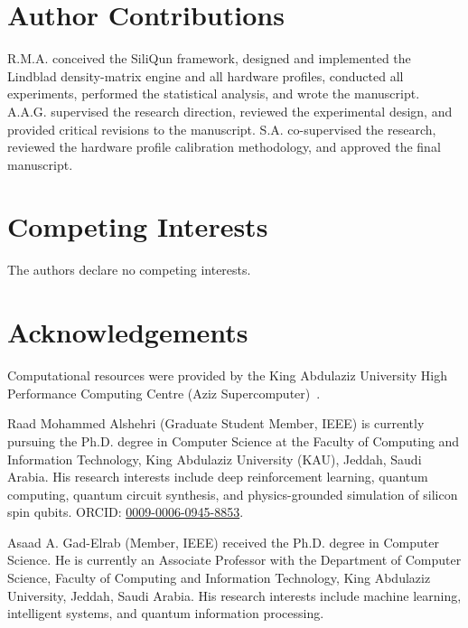 \documentclass[journal]{IEEEtran}
\begin{document}
\section*{Author Contributions}
R.M.A. conceived the SiliQun framework, designed and implemented the
Lindblad density-matrix engine and all hardware profiles, conducted all
experiments, performed the statistical analysis, and wrote the manuscript.
A.A.G. supervised the research direction, reviewed the experimental design,
and provided critical revisions to the manuscript.
S.A. co-supervised the research, reviewed the hardware profile calibration
methodology, and approved the final manuscript.

\section*{Competing Interests}
The authors declare no competing interests.

\section*{Acknowledgements}
Computational resources were provided by the King Abdulaziz University
High Performance Computing Centre (Aziz Supercomputer)~\cite{AzizHPC}.

\begin{IEEEbiography}{Raad Mohammed Alshehri}
(Graduate Student Member, IEEE) is currently pursuing the Ph.D. degree in
Computer Science at the Faculty of Computing and Information Technology,
King Abdulaziz University (KAU), Jeddah, Saudi Arabia. His research interests
include deep reinforcement learning, quantum computing, quantum circuit synthesis,
and physics-grounded simulation of silicon spin qubits.
ORCID: \href{https://orcid.org/0009-0006-0945-8853}{0009-0006-0945-8853}.
\end{IEEEbiography}

\begin{IEEEbiography}{Asaad A. Gad-Elrab}
(Member, IEEE) received the Ph.D. degree in Computer Science. He is currently
an Associate Professor with the Department of Computer Science, Faculty of
Computing and Information Technology, King Abdulaziz University, Jeddah,
Saudi Arabia. His research interests include machine learning, intelligent
systems, and quantum information processing.
\end{IEEEbiography}
\end{document}
